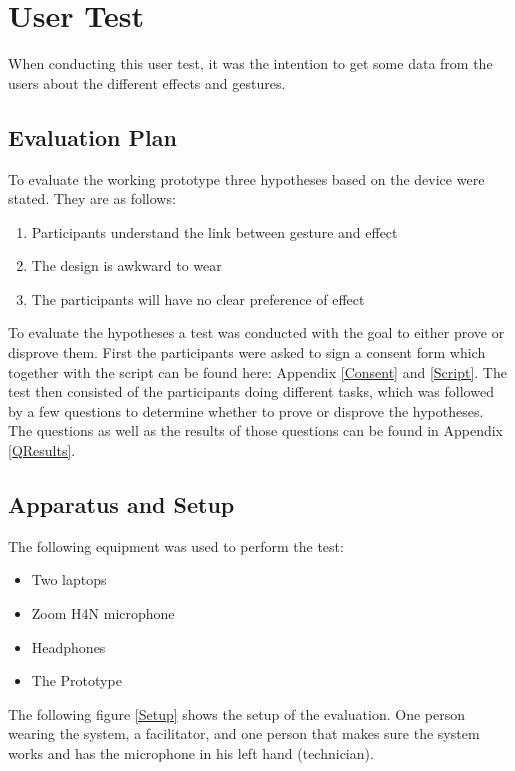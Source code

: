 \section{User Test}
When conducting this user test, it was the intention to get some data from the users about the different effects and gestures. 

\subsection{Evaluation Plan}
To evaluate the working prototype three hypotheses based on the device were stated. They are as follows:

\begin{enumerate}
\item Participants understand the link between gesture and effect
\item The design is awkward to wear
\item The participants will have no clear preference of effect
\end{enumerate} 

To evaluate the hypotheses a test was conducted with the goal to either prove or disprove them. First the participants were asked to sign a consent form which together with the script can be found here: Appendix \ref{Consent} and \ref{Script}. The test then consisted of the participants doing different tasks, which was followed by a few questions to determine whether to prove or disprove the hypotheses. The questions as well as the results of those questions can be found in Appendix \ref{QResults}.

\subsection{Apparatus and Setup}

The following equipment was used to perform the test:
\begin{itemize}
 \item Two laptops
 \item Zoom H4N microphone 
 \item Headphones
 \item The Prototype
\end{itemize}

The following figure \ref{Setup} shows the setup of the evaluation. One person wearing the system, a facilitator, and one person that makes sure the system works and has the microphone in 
his left hand (technician).

